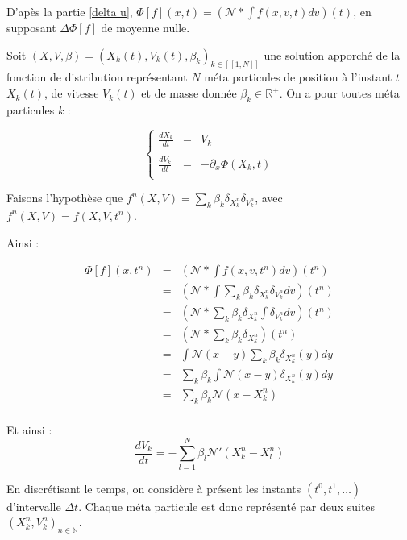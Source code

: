 \documentclass[a4paper,11pt]{article}
\begin{document}
D'apès la partie \ref{delta u}, $\Phi[f](x,t) = (\mathcal{N} \ast \int f(x,v,t)dv) (t)$, en supposant $\Delta \Phi [f]$ de moyenne nulle.

Soit $(X,V, \beta) = (X_k(t),V_k(t), \beta_k)_{k \in [\![ 1, N]\!]}$ une solution apporché de la fonction de distribution représentant $N$ méta particules de position à l'instant $t$ $X_k(t)$, de vitesse $V_k(t)$ et de masse donnée $\beta_k \in \mathbb{R^+}$. On a pour toutes méta particules $k$ :

$$
\left\lbrace
\begin{array}{rcl}

\frac{dX_k}{dt} &=& V_k \\ \\
\frac{dV_k}{dt} &=& - \partial_x \Phi(X_k, t) \\

\end{array} \right.
$$

Faisons l'hypothèse que $f^n(X,V) = \sum\limits_k \beta_k \delta_{X_k^n} \delta_{ V_k^n}$, avec $f^n(X,V) = f(X,V, t^n)$.

Ainsi :

$$
\begin{array}{rcl}

\Phi[f](x,t^n) &=& (\mathcal{N} \ast \int f(x,v,t^n)dv) (t^n) \\
	&=&  (\mathcal{N} \ast \int \sum\limits_k \beta_k \delta_{X_k^n} \delta_{ V_k^n}dv) (t^n) \\
	&=& (\mathcal{N} \ast \sum\limits_k \beta_k \delta_{X_k^n} \int \delta_{ V_k^n}dv) (t^n) \\
	&=& (\mathcal{N} \ast \sum\limits_k \beta_k \delta_{X_k^n}) (t^n) \\
	&=& \int \mathcal{N}(x-y) \sum\limits_k \beta_k \delta_{X_k^n}(y) dy \\
	&=& \sum\limits_k \beta_k  \int \mathcal{N}(x-y) \delta_{X_k^n}(y) dy \\
	&=& \sum\limits_k \beta_k  \mathcal{N}(x-X_k^n) \\

\end{array}
$$

Et ainsi : 
$$
\boxed{\frac{d V_k} {dt} = -\sum\limits_{l=1}^N \beta_l  \mathcal{N}'(X_k^n-X_l^n)}
$$

En discrétisant le temps, on considère à présent les instants $(t^0, t^1, \dots)$ d'intervalle $\Delta t$. Chaque méta particule est donc représenté par deux suites $(X_k^n, V_k^n)_{n \in \mathbb{N}}$.
\end{document}
